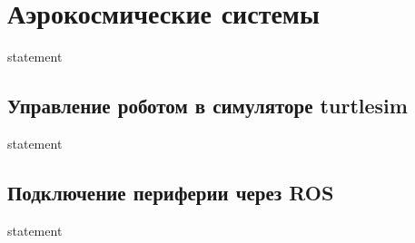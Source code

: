 \chapter{Аэрокосмические системы}

{statement}

\section{Управление роботом в симуляторе turtlesim}

{statement}

\section{Подключение периферии через ROS}

{statement}